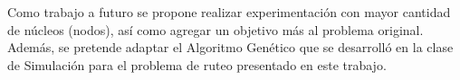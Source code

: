 \documentclass[review]{elsarticle}
\begin{document}
Como trabajo a futuro se propone realizar experimentación con mayor cantidad de núcleos (nodos), así como agregar un objetivo más al problema original. Además, se pretende adaptar el Algoritmo Genético que se desarrolló en la clase de Simulación para el problema de ruteo presentado en este trabajo. 


\end{document}
